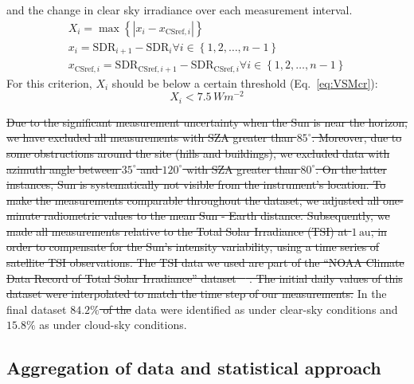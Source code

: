 \documentclass[applsci,article,submit,moreauthors,pdftex]{Definitions/mdpi}
\providecommand{\DIFadd}[1]{{\protect\color{blue}\uwave{#1}}} %
\providecommand{\DIFdel}[1]{{\protect\color{red}\sout{#1}}}                      %
\providecommand{\DIFaddbegin}{} %
\providecommand{\DIFaddend}{} %
\providecommand{\DIFdelbegin}{} %
\providecommand{\DIFdelend}{} %
\begin{document}
\begin{enumerate}
  and the change in clear sky irradiance over each measurement interval.
  \begin{gather}
    X_i = \max{\left \{ \left | x_i - x_{\text{CSref},i} \right | \right \}} \label{eq:VSM3} \\
    x_i = \text{SDR}_{i+1} - \text{SDR}_{i} \forall i \in \left \{ 1, 2, \ldots, n-1 \right \} \label{eq:VSM1} \\
    x_{\text{CSref},i} = \text{SDR}_{\text{CSref},i+1} - \text{SDR}_{\text{CSref},i} \forall i \in \left \{ 1, 2, \ldots, n-1 \right \} \label{eq:VSM2}
  \end{gather} For this criterion, \(X_i\) should be below a certain
  threshold (Eq.~\ref{eq:VSMcr}): \begin{equation}
    X_i < 7.5\,Wm^{-2} \label{eq:VSMcr}
  \end{equation}
\end{enumerate}

\DIFdelbegin \DIFdel{Due to the significant measurement uncertainty when the Sun is near the
horizon, we have excluded all measurements with SZA greater than
\(85^\circ\). Moreover, due to some obstructions around the site (hills
and buildings), we excluded data with azimuth angle between \(35^\circ\)
and \(120^\circ\) with SZA greater than \(80^\circ\). On the latter
instances, Sun is systematically not visible from the instrument's
location. To make the measurements comparable throughout the dataset, we
adjusted all one-minute radiometric values to the mean Sun - Earth
distance. Subsequently, we made all measurements relative to the Total
Solar Irradiance (TSI) at \(1\,\text{au}\), in order to compensate for
the Sun's intensity variability, using a time series of satellite TSI
observations. The TSI data we used are part of the ``NOAA Climate Data
Record of Total Solar Irradiance'' dataset \mbox{%
\citep{Coddington2005}}\hskip0pt%
. The
initial daily values of this dataset were interpolated to match the time
step of our measurements. }\DIFdelend In the final dataset \DIFdelbegin \DIFdel{\(84.2\%\) of the }\DIFdelend \DIFaddbegin \DIFadd{\(23.3\%\) of the 1-minute }\DIFaddend data were identified as
under clear-sky conditions and \DIFdelbegin \DIFdel{\(15.8\%\) }\DIFdelend \DIFaddbegin \DIFadd{\(43\%\) }\DIFaddend as under cloud-sky conditions.

\DIFaddbegin \hypertarget{aggregation-of-data-and-statistical-approach}{%
\subsection{Aggregation of data and statistical
approach}\label{aggregation-of-data-and-statistical-approach}}
\end{document}
